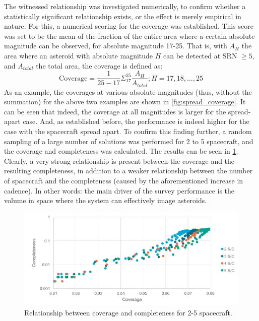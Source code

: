 The witnessed relationship was investigated numerically, to confirm whether a statistically significant relationship exists, or the effect is merely empirical in nature. For this, a numerical scoring for the coverage was established. This score was set to be the mean of the fraction of the entire area where a certain absolute magnitude can be observed, for absolute magnitude 17-25. That is, with $A_{H}$ the area where an asteroid with absolute magnitude $H$ can be detected at SRN $\geq 5$, and $A_{total}$ the total area, the coverage is defined as:
\begin{equation}
 \mathrm{Coverage} = \frac{1}{25-17}\Sigma_17^25 \frac{A_{H}}{A_{total}}; H = 17, 18, ..., 25
\end{equation}
As an example, the coverages at various absolute magnitudes (thus, without the summation) for the above two examples are shown in \autoref{fig:spread_coverage}. It can be seen that indeed, the coverage at all magnitudes is larger for the spread-apart case. And, as established before, the performance is indeed higher for the case with the spacecraft spread apart. To confirm this finding further, a random sampling of a large number of solutions was performed for 2 to 5 spacecraft, and the coverage and completeness was calculated. The results can be seen in \ref{fig:coverage_completeness}. Clearly, a very strong relationship is present between the coverage and the resulting completeness, in addition to a weaker relationship between the number of spacecraft and the completeness (caused by the aforementioned increase in cadence). In other words: the main driver of the survey performance is the volume in space where the system can effectively image asteroids. \\

\begin{figure}[htbp]
 \centering
 \includegraphics[width=1.0\textwidth]{img/coverage_completeness.png}
 \caption{Relationship between coverage and completeness for 2-5 spacecraft.}
 \label{fig:coverage_completeness}
\end{figure}

